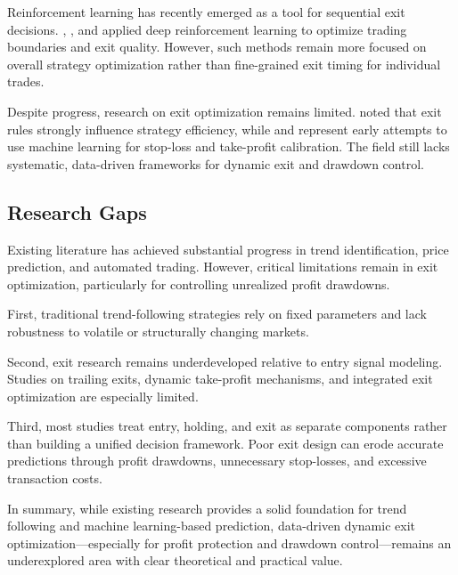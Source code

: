 \documentclass[12pt]{article}
\begin{document}
Reinforcement learning has recently emerged as a tool for sequential exit decisions. 
\citet{KimKim2019}, \citet{TsantekidisEtAl2020}, and \citet{WangEtAl2021} applied deep 
reinforcement learning to optimize trading boundaries and exit quality. However, such 
methods remain more focused on overall strategy optimization rather than fine-grained exit 
timing for individual trades.

Despite progress, research on exit optimization remains limited. \citet{HwangEtAl2023} noted 
that exit rules strongly influence strategy efficiency, while \citet{SivriEtAl2023} 
and \citet{Shawky2023} represent early attempts to use machine learning for stop-loss and 
take-profit calibration. The field still lacks systematic, data-driven frameworks for 
dynamic exit and drawdown control.

\subsection{Research Gaps}

Existing literature has achieved substantial progress in trend identification, price 
prediction, and automated trading. However, critical limitations remain in exit optimization, 
particularly for controlling unrealized profit drawdowns.

First, traditional trend-following strategies rely on fixed parameters and lack robustness to 
volatile or structurally changing markets.

Second, exit research remains underdeveloped relative to entry signal modeling. Studies on 
trailing exits, dynamic take-profit mechanisms, and integrated exit optimization are 
especially limited.

Third, most studies treat entry, holding, and exit as separate components rather than 
building a unified decision framework. Poor exit design can erode accurate predictions 
through profit drawdowns, unnecessary stop-losses, and excessive transaction costs.

In summary, while existing research provides a solid foundation for trend following and 
machine learning-based prediction, data-driven dynamic exit optimization—especially for 
profit protection and drawdown control—remains an underexplored area with clear theoretical 
and practical value.

% 
% 


\end{document}
